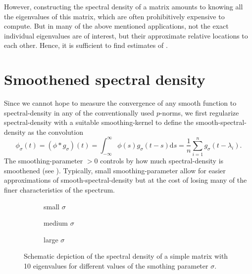 However, constructing the spectral density of a matrix amounts to knowing all
the eigenvalues of this matrix, which are often prohibitively expensive to
compute. But in many of the above mentioned applications, not the exact individual
eigenvalues are of interest, but their approximate relative locations to each
other. Hence, it is sufficient to find estimates of .


\section{Smoothened spectral density}
\label{sec:1-introduction-properties}

Since we cannot hope to measure the convergence of any smooth function to
\gls{spectral-density} in any of the conventionally used $p$-norms,
we first regularize \gls{spectral-density} with a suitable \gls{smoothing-kernel}
to define the \gls{smooth-spectral-density} as the convolution
\begin{equation}
    \phi_{\sigma}(t) = (\phi \ast g_{\sigma})(t) = \int_{-\infty}^{\infty} \phi(s) g_{\sigma}(t - s) \mathrm{d}s = \frac{1}{n} \sum_{i=1}^{n} g_{\sigma}(t - \lambda_i).
    \label{equ:1-introduction-def-smooth-spectral-density}
\end{equation}
The \gls{smoothing-parameter} $>0$ controls by how much \gls{spectral-density} is
smoothened (see ). Typically,
small \gls{smoothing-parameter} allow for easier approximations of \gls{smooth-spectral-density}
but at the cost of losing many of the finer characteristics of the spectrum.\\

\begin{figure}[ht]
    \begin{subfigure}[b]{0.32\columnwidth}
        
        \caption{small $\sigma$}
        \label{fig:1-introduction-spectral-density-example-0.01}
    \end{subfigure}
    \begin{subfigure}[b]{0.32\columnwidth}
        
        \caption{medium $\sigma$}
        \label{fig:1-introduction-spectral-density-example-0.02}
    \end{subfigure}
    \begin{subfigure}[b]{0.32\columnwidth}
        
        \caption{large $\sigma$}
        \label{fig:1-introduction-spectral-density-example-0.05}
    \end{subfigure}
    \caption{Schematic depiction of the spectral density of a simple matrix with
    10 eigenvalues for different values of the smothing parameter $\sigma$.}
    \label{fig:1-introduction-smoothened-spectral-density}
\end{figure}

